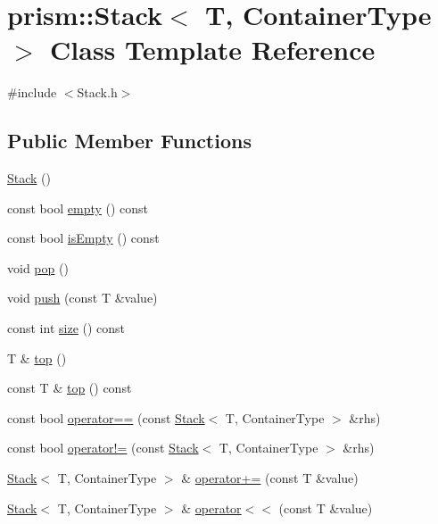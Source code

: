 \hypertarget{classprism_1_1_stack}{}\section{prism\+:\+:Stack$<$ T, Container\+Type $>$ Class Template Reference}
\label{classprism_1_1_stack}


{\ttfamily \#include $<$Stack.\+h$>$}

\subsection*{Public Member Functions}
\begin{DoxyCompactItemize}
\item 
\hyperlink{classprism_1_1_stack_a4da568aa6d3ca0042123fdbe4ec131df}{Stack} ()
\item 
const bool \hyperlink{classprism_1_1_stack_a186c8700a2150e20ccd3c44c5a233f57}{empty} () const 
\item 
const bool \hyperlink{classprism_1_1_stack_a4a3ffd6921356ad4bb7b5980c913d3b3}{is\+Empty} () const 
\item 
void \hyperlink{classprism_1_1_stack_ada448478a035c703d738d025370f0ad1}{pop} ()
\item 
void \hyperlink{classprism_1_1_stack_a7477a66874bfcc5cfc7e16d7f0e8a3c1}{push} (const T \&value)
\item 
const int \hyperlink{classprism_1_1_stack_ad8805f421b46c591bde99520edfa5f28}{size} () const 
\item 
T \& \hyperlink{classprism_1_1_stack_af33699fcb4ad2b0b3b20c39debe0d72a}{top} ()
\item 
const T \& \hyperlink{classprism_1_1_stack_a33d812475def65e53b13ab5aa171e146}{top} () const 
\item 
const bool \hyperlink{classprism_1_1_stack_afc17fcd9588a6d9f95af0bef309f8425}{operator==} (const \hyperlink{classprism_1_1_stack}{Stack}$<$ T, Container\+Type $>$ \&rhs)
\item 
const bool \hyperlink{classprism_1_1_stack_af12831daa5d4ba74a77d09fbf43250db}{operator!=} (const \hyperlink{classprism_1_1_stack}{Stack}$<$ T, Container\+Type $>$ \&rhs)
\item 
\hyperlink{classprism_1_1_stack}{Stack}$<$ T, Container\+Type $>$ \& \hyperlink{classprism_1_1_stack_aaf33f28fe48772fdf5f50cb32e04ff4f}{operator+=} (const T \&value)
\item 
\hyperlink{classprism_1_1_stack}{Stack}$<$ T, Container\+Type $>$ \& \hyperlink{classprism_1_1_stack_a246b7ed1175426ba782e6d07d5cc4813}{operator$<$$<$} (const T \&value)
\end{DoxyCompactItemize}


